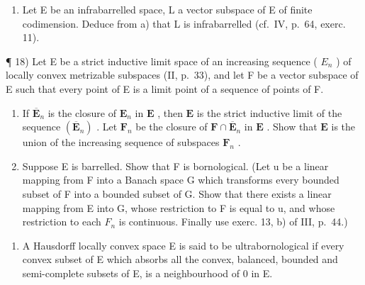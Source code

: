 \begin{enumerate}
\def\labelenumi{\alph{enumi})}
\setcounter{enumi}{1}
\tightlist
\item
  Let E be an infrabarrelled space, L a vector subspace of E of finite codimension. Deduce from a) that L is infrabarrelled (cf.~IV, p.~64, exerc. 11).
\end{enumerate}

¶ 18) Let E be a strict inductive limit space of an increasing sequence ( \(E_{n}\) ) of locally convex metrizable subspaces (II, p.~33), and let F be a vector subspace of E such that every point of E is a limit point of a sequence of points of F.

\begin{enumerate}
\def\labelenumi{\alph{enumi})}
\item
  If \(\overline{\mathbf{E}}_n\) is the closure of \(\mathbf{E}_n\) in \(\mathbf{E}\) , then \(\mathbf{E}\) is the strict inductive limit of the sequence \((\overline{\mathbf{E}}_n)\) . Let \(\mathbf{F}_n\) be the closure of \(\mathbf{F} \cap \overline{\mathbf{E}}_n\) in \(\mathbf{E}\) . Show that \(\mathbf{E}\) is the union of the increasing sequence of subspaces \(\mathbf{F}_n\) .
\item
  Suppose E is barrelled. Show that F is bornological. (Let u be a linear mapping from F into a Banach space G which transforms every bounded subset of F into a bounded subset of G. Show that there exists a linear mapping from E into G, whose restriction to F is equal to u, and whose restriction to each \(F_{n}\) is continuous. Finally use exerc. 13, b) of III, p.~44.)
\end{enumerate}

\begin{enumerate}
\def\labelenumi{\arabic{enumi})}
\setcounter{enumi}{18}
\tightlist
\item
  A Hausdorff locally convex space E is said to be ultrabornological if every convex subset of E which absorbs all the convex, balanced, bounded and semi-complete subsets of E, is a neighbourhood of 0 in E.
\end{enumerate}

